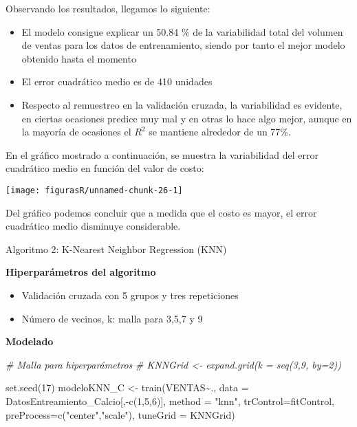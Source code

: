 \documentclass[
]{article}
\newenvironment{Shaded}{\begin{snugshade}}{\end{snugshade}}
\newcommand{\AttributeTok}[1]{\textcolor[rgb]{0.77,0.63,0.00}{#1}}
\newcommand{\CommentTok}[1]{\textcolor[rgb]{0.56,0.35,0.01}{\textit{#1}}}
\newcommand{\DecValTok}[1]{\textcolor[rgb]{0.00,0.00,0.81}{#1}}
\newcommand{\FunctionTok}[1]{\textcolor[rgb]{0.00,0.00,0.00}{#1}}
\newcommand{\NormalTok}[1]{#1}
\newcommand{\OtherTok}[1]{\textcolor[rgb]{0.56,0.35,0.01}{#1}}
\newcommand{\SpecialCharTok}[1]{\textcolor[rgb]{0.00,0.00,0.00}{#1}}
\newcommand{\StringTok}[1]{\textcolor[rgb]{0.31,0.60,0.02}{#1}}
\providecommand{\tightlist}{%
  \setlength{\itemsep}{0pt}\setlength{\parskip}{0pt}}
\begin{document}
Observando los resultados, llegamos lo siguiente:

\begin{itemize}
\tightlist
\item
  El modelo consigue explicar un 50.84 \% de la variabilidad total del
  volumen de ventas para los datos de entrenamiento, siendo por tanto el
  mejor modelo obtenido hasta el momento
\item
  El error cuadrático medio es de 410 unidades
\item
  Respecto al remuestreo en la validación cruzada, la variabilidad es
  evidente, en ciertas ocasiones predice muy mal y en otras lo hace algo
  mejor, aunque en la mayoría de ocasiones el \(R^2\) se mantiene
  alrededor de un 77\%.
\end{itemize}

En el gráfico mostrado a continuación, se muestra la variabilidad del
error cuadrático medio en función del valor de costo:

\begin{center}\texttt{[image: figurasR/unnamed-chunk-26-1]} \end{center}

Del gráfico podemos concluir que a medida que el costo es mayor, el
error cuadrático medio disminuye considerable.

Algoritmo 2: K-Nearest Neighbor Regression (KNN)

\textbf{Hiperparámetros del algoritmo}

\begin{itemize}
\tightlist
\item
  Validación cruzada con 5 grupos y tres repeticiones
\item
  Número de vecinos, k: malla para 3,5,7 y 9
\end{itemize}

\textbf{Modelado}

\begin{Shaded}
\begin{Highlighting}[]
\CommentTok{\# Malla para hiperparámetros}
\CommentTok{\# KNNGrid \textless{}{-}  expand.grid(k = seq(3,9, by=2))}

\FunctionTok{set.seed}\NormalTok{(}\DecValTok{17}\NormalTok{)}
\NormalTok{modeloKNN\_C }\OtherTok{\textless{}{-}} \FunctionTok{train}\NormalTok{(VENTAS}\SpecialCharTok{\textasciitilde{}}\NormalTok{., }
                \AttributeTok{data =}\NormalTok{ DatosEntreamiento\_Calcio[,}\SpecialCharTok{{-}}\FunctionTok{c}\NormalTok{(}\DecValTok{1}\NormalTok{,}\DecValTok{5}\NormalTok{,}\DecValTok{6}\NormalTok{)], }
                \AttributeTok{method =} \StringTok{"knn"}\NormalTok{, }
                \AttributeTok{trControl=}\NormalTok{fitControl, }
                \AttributeTok{preProcess=}\FunctionTok{c}\NormalTok{(}\StringTok{"center"}\NormalTok{,}\StringTok{"scale"}\NormalTok{),}
                \AttributeTok{tuneGrid =}\NormalTok{ KNNGrid)}
\end{Highlighting}
\end{Shaded}
\end{document}
